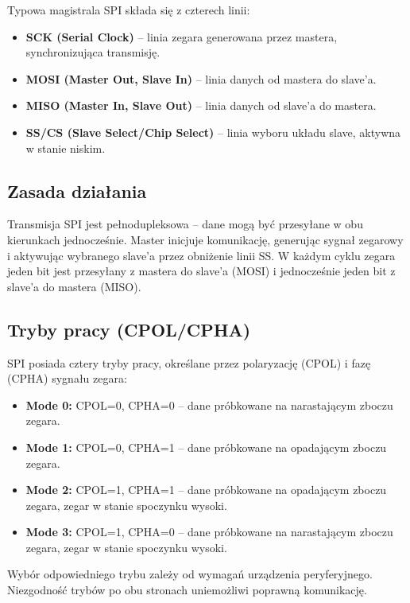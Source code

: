 \documentclass[letterpaper,11pt]{report}
\begin{document}
Typowa magistrala SPI składa się z czterech linii:
\begin{itemize}
    \item \textbf{SCK (Serial Clock)} – linia zegara generowana przez mastera, synchronizująca transmisję.
    \item \textbf{MOSI (Master Out, Slave In)} – linia danych od mastera do slave'a.
    \item \textbf{MISO (Master In, Slave Out)} – linia danych od slave'a do mastera.
    \item \textbf{SS/CS (Slave Select/Chip Select)} – linia wyboru układu slave, aktywna w stanie niskim.
\end{itemize}

\subsection{Zasada działania}

Transmisja SPI jest pełnodupleksowa – dane mogą być przesyłane w obu kierunkach jednocześnie. Master inicjuje komunikację, generując sygnał zegarowy i aktywując wybranego slave'a przez obniżenie linii SS. W każdym cyklu zegara jeden bit jest przesyłany z mastera do slave'a (MOSI) i jednocześnie jeden bit z slave'a do mastera (MISO).

\subsection*{Tryby pracy (CPOL/CPHA)}

SPI posiada cztery tryby pracy, określane przez polaryzację (CPOL) i fazę (CPHA) sygnału zegara:
\begin{itemize}
    \item \textbf{Mode 0:} CPOL=0, CPHA=0 – dane próbkowane na narastającym zboczu zegara.
    \item \textbf{Mode 1:} CPOL=0, CPHA=1 – dane próbkowane na opadającym zboczu zegara.
    \item \textbf{Mode 2:} CPOL=1, CPHA=1 – dane próbkowane na opadającym zboczu zegara, zegar w stanie spoczynku wysoki.
    \item \textbf{Mode 3:} CPOL=1, CPHA=0 – dane próbkowane na narastającym zboczu zegara, zegar w stanie spoczynku wysoki.
\end{itemize}

Wybór odpowiedniego trybu zależy od wymagań urządzenia peryferyjnego. Niezgodność trybów po obu stronach uniemożliwi poprawną komunikację.
\end{document}
